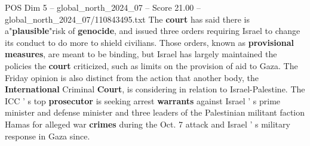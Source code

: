 \begin{textsample}{POS Dim 5 – global\_north\_2024\_07 – Score 21.00 – global\_north\_2024\_07/110843495.txt}
The \textbf{court} has said there is a"\textbf{plausible}"risk of \textbf{genocide}, and issued three orders requiring Israel to change its conduct to do more to shield civilians.
Those orders, known as \textbf{provisional} \textbf{measures}, are meant to be binding, but Israel has largely maintained the policies the \textbf{court} criticized, such as limits on the provision of aid to Gaza.
The Friday opinion is also distinct from the action that another body, the \textbf{International} Criminal \textbf{Court}, is considering in relation to Israel-Palestine.
The ICC ' s top \textbf{prosecutor} is seeking arrest \textbf{warrants} against Israel ' s prime minister and defense minister and three leaders of the Palestinian militant faction Hamas for alleged war \textbf{crimes} during the Oct. 7 attack and Israel ' s military response in Gaza since.

\end{textsample}
